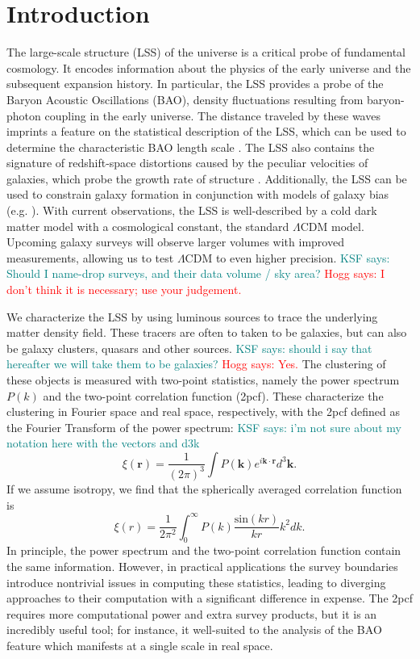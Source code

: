 \documentclass[modern]{aastex62}
\newcommand{\cf}{2pcf\xspace} %
\newcommand{\KSF}[1]{\textcolor{teal}{KSF says: #1}}
\newcommand{\hogg}[1]{\textcolor{red}{Hogg says: #1}}
\begin{document}

\section{Introduction}

The large-scale structure (LSS) of the universe is a critical probe of fundamental cosmology. 
It encodes information about the physics of the early universe and the subsequent expansion history.
In particular, the LSS provides a probe of the Baryon Acoustic Oscillations (BAO), density fluctuations resulting from baryon-photon coupling in the early universe.
The distance traveled by these waves imprints a feature on the statistical description of the LSS, which can be used to determine the characteristic BAO length scale \citep{EisensteinHu1998}.
The LSS also contains the signature of redshift-space distortions caused by the peculiar velocities of galaxies, which probe the growth rate of structure \citep{Kaiser1987}.
Additionally, the LSS can be used to constrain galaxy formation in conjunction with models of galaxy bias (e.g. \citealt{Hamilton1988}). %
With current observations, the LSS is well-described by a cold dark matter model with a cosmological constant, the standard $\Lambda$CDM model.
Upcoming galaxy surveys will observe larger volumes with improved measurements, allowing us to test $\Lambda$CDM to even higher precision.
\KSF{Should I name-drop surveys, and their data volume / sky area?} \hogg{I don't think it is necessary; use your judgement.}

We characterize the LSS by using luminous sources to trace the underlying matter density field.
These tracers are often to taken to be galaxies, but can also be galaxy clusters, quasars and other sources.
\KSF{should i say that hereafter we will take them to be galaxies?} \hogg{Yes.}
The clustering of these objects is measured with two-point statistics, namely the power spectrum $P(k)$ and the two-point correlation function (\cf).
These characterize the clustering in Fourier space and real space, respectively, with the \cf defined as the Fourier Transform of the power spectrum: 
\KSF{i'm not sure about my notation here with the vectors and d3k}
\begin{equation}
\xi(\mathbf{r}) = \frac{1}{(2\pi)^3} \int P(\mathbf{k}) e^{i\mathbf{k} \cdot \mathbf{r}} d^3\mathbf{k}.
\end{equation}
If we assume isotropy, we find that the spherically averaged correlation function is
\begin{equation}
\xi(r) = \frac{1}{2\pi^2} \int_0^{\infty} P(k) \frac{\mathrm{sin}(kr)}{kr} k^2 dk.
\end{equation}
In principle, the power spectrum and the two-point correlation function contain the same information.
However, in practical applications the survey boundaries introduce nontrivial issues in computing these statistics, leading to diverging approaches to their computation with a significant difference in expense.
The \cf requires more computational power and extra survey products, but it is an incredibly useful tool; for instance, it well-suited to the analysis of the BAO feature which manifests at a single scale in real space.
\end{document}
